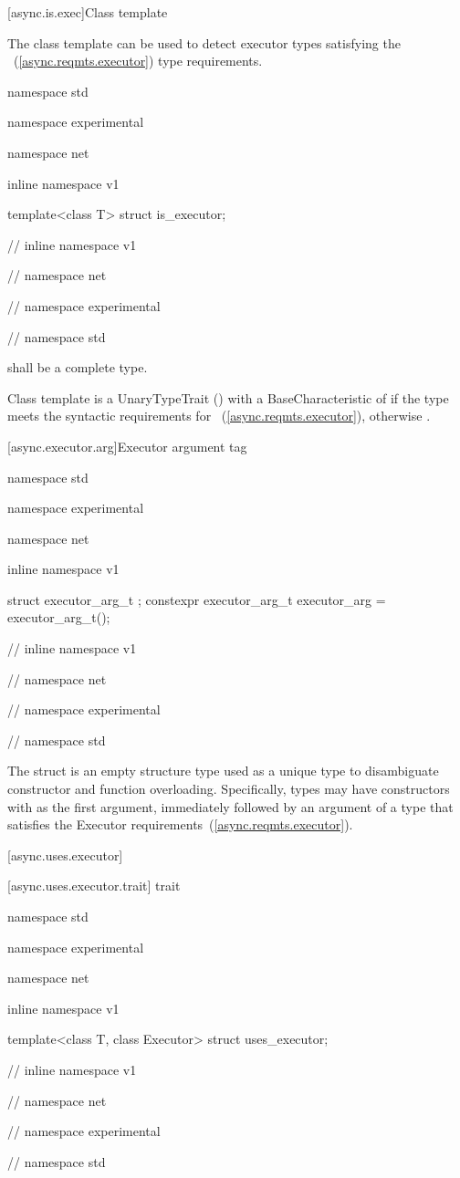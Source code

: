 [async.is.exec]{Class template }

\pnum
The class template  can be used to detect executor types satisfying the ~(\ref{async.reqmts.executor}) type requirements.

\begin{codeblock}
namespace std {
namespace experimental {
namespace net {
inline namespace v1 {

  template<class T> struct is_executor;

} // inline namespace v1
} // namespace net
} // namespace experimental
} // namespace std
\end{codeblock}

\pnum
{} shall be a complete type.

\pnum
Class template  is a UnaryTypeTrait () with a BaseCharacteristic of  if the type  meets the syntactic requirements for ~(\ref{async.reqmts.executor}), otherwise .



[async.executor.arg]{Executor argument tag}

\begin{codeblock}
namespace std {
namespace experimental {
namespace net {
inline namespace v1 {

  struct executor_arg_t { };
  constexpr executor_arg_t executor_arg = executor_arg_t();

} // inline namespace v1
} // namespace net
} // namespace experimental
} // namespace std
\end{codeblock}

\pnum
The  struct is an empty structure type used as a unique type to disambiguate constructor and function overloading. Specifically, types may have constructors with  as the first argument, immediately followed by an argument of a type that satisfies the Executor requirements~(\ref{async.reqmts.executor}).



[async.uses.executor]{}


[async.uses.executor.trait]{ trait}

\begin{codeblock}
namespace std {
namespace experimental {
namespace net {
inline namespace v1 {

  template<class T, class Executor> struct uses_executor;

} // inline namespace v1
} // namespace net
} // namespace experimental
} // namespace std
\end{codeblock}

